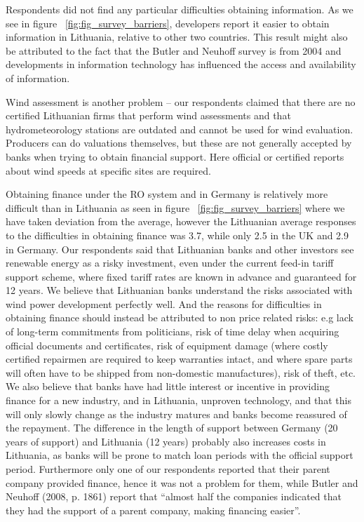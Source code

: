\documentclass[a4paper, 12pt]{article}
\begin{document}
Respondents did not find any particular difficulties obtaining information. As we see in figure ~\ref{fig:fig_survey_barriers}, developers report it easier to obtain information in Lithuania, relative to other two countries. This result might also be attributed to the fact that the Butler and Neuhoff survey is from 2004 and developments in information technology has influenced the access and availability of information.

Wind assessment is another problem – our respondents claimed that there are no certified Lithuanian firms that perform wind assessments and that hydrometeorology stations are outdated and cannot be used for wind evaluation. Producers can do valuations themselves, but these are not generally accepted by banks when trying to obtain financial support. Here official or certified reports about wind speeds at specific sites are required.

Obtaining finance under the RO system and in Germany is relatively more difficult than in Lithuania as seen in figure ~\ref{fig:fig_survey_barriers} where we have taken deviation from the average, however the Lithuanian average responses to the difficulties in obtaining finance was 3.7, while only 2.5 in the UK and 2.9 in Germany. Our respondents said that Lithuanian banks and other investors see renewable energy as a risky investment, even under the current feed-in tariff support scheme, where fixed tariff rates are known in advance and guaranteed for 12 years. We believe that Lithuanian banks understand the risks associated with wind power development perfectly well. And the reasons for difficulties in obtaining finance should instead be attributed to non price related risks: e.g lack of long-term commitments from politicians, risk of time delay when acquiring official documents and certificates, risk of equipment damage (where costly certified repairmen are required to keep warranties intact, and where spare parts will often have to be shipped from non-domestic manufactures), risk of theft, etc. We also believe that banks have had little interest or incentive in providing finance for a new industry, and in Lithuania, unproven technology, and that this will only slowly change as the industry matures and banks become reassured of the repayment. The difference in the length of support between Germany (20 years of support) and Lithuania (12 years) probably also increases costs in Lithuania, as banks will be prone to match loan periods with the official support period. Furthermore only one of our respondents reported that their parent company provided finance, hence it was not a problem for them, while Butler and Neuhoff (2008, p. 1861) report that ``almost half the companies indicated that they had the support of a parent company, making financing easier''. 
\end{document}
